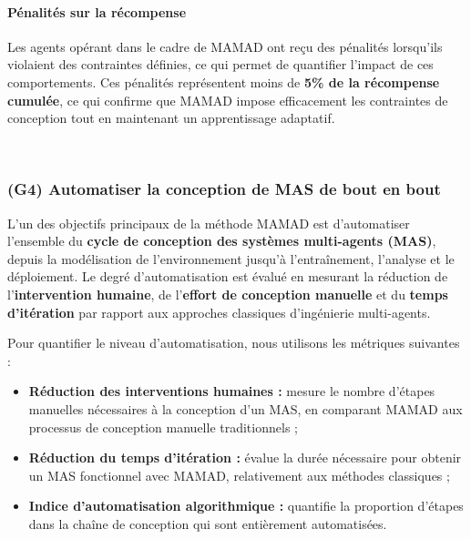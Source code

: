 \paragraph{Pénalités sur la récompense}
Les agents opérant dans le cadre de MAMAD ont reçu des pénalités lorsqu'ils violaient des contraintes définies, ce qui permet de quantifier l'impact de ces comportements. Ces pénalités représentent moins de \textbf{5\% de la récompense cumulée}, ce qui confirme que MAMAD impose efficacement les contraintes de conception tout en maintenant un apprentissage adaptatif.

\

\subsubsection{(G4) Automatiser la conception de MAS de bout en bout}

L'un des objectifs principaux de la méthode MAMAD est d'automatiser l'ensemble du \textbf{cycle de conception des systèmes multi-agents (MAS)}, depuis la modélisation de l'environnement jusqu'à l'entraînement, l'analyse et le déploiement. Le degré d'automatisation est évalué en mesurant la réduction de l'\textbf{intervention humaine}, de l'\textbf{effort de conception manuelle} et du \textbf{temps d'itération} par rapport aux approches classiques d'ingénierie multi-agents.

Pour quantifier le niveau d'automatisation, nous utilisons les métriques suivantes :

\begin{itemize}
    \item \textbf{Réduction des interventions humaines :} mesure le nombre d'étapes manuelles nécessaires à la conception d'un MAS, en comparant MAMAD aux processus de conception manuelle traditionnels ;
    \item \textbf{Réduction du temps d'itération :} évalue la durée nécessaire pour obtenir un MAS fonctionnel avec MAMAD, relativement aux méthodes classiques ;
    \item \textbf{Indice d'automatisation algorithmique :} quantifie la proportion d'étapes dans la chaîne de conception qui sont entièrement automatisées.
\end{itemize}

